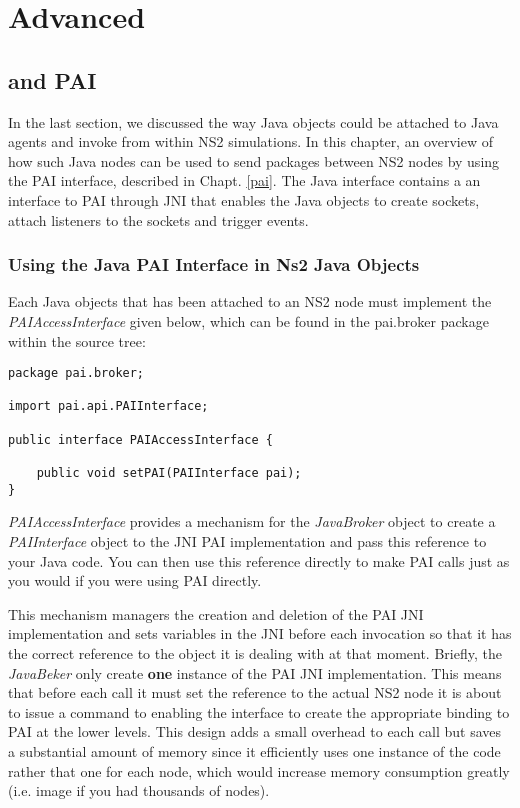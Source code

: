 \chapter{Advanced \agentj}
\label{jnipai}

\section{\agentj and PAI}

In the last section, we discussed the way Java objects could be
attached to Java agents and invoke from within NS2 simulations.
In this chapter, an overview of how such Java nodes can be used 
to send packages between NS2 nodes by using the PAI interface,
described in Chapt. \ref{pai}.  The Java interface contains a
an interface to PAI through JNI that enables the Java objects
to create sockets, attach listeners to the sockets and trigger 
events.

\subsection{Using the Java PAI Interface in Ns2 Java Objects}
\label{jnipai:jpaireqs}
 
Each Java objects that has been attached to an NS2 node
must implement the \emph{PAIAccessInterface} given
below, which can be found in the pai.broker package within the
source tree:

\footnotesize
\begin{verbatim}
package pai.broker;

import pai.api.PAIInterface;

public interface PAIAccessInterface {

    public void setPAI(PAIInterface pai);
}

\end{verbatim}
\normalsize


\emph{PAIAccessInterface} provides a mechanism for the 
\emph{JavaBroker} object to create a \emph{PAIInterface} 
object to the JNI PAI implementation and pass this reference 
to your Java code.  You can then use this reference 
directly to make PAI calls just as you would if you were 
using PAI directly.

This mechanism managers the creation and deletion of the
PAI JNI implementation and sets variables in the JNI before
each invocation so that it has the correct reference to the 
object it is dealing with at that moment.  Briefly, the 
\emph{JavaBeker} only create \textbf{one} instance of
the PAI JNI implementation. This means that before each
call it must set the reference to the actual NS2 node it is
about to issue a command to enabling the interface to 
create the appropriate binding to PAI at the lower levels.
This design adds a small overhead to each call but saves
a substantial amount of memory since it efficiently uses
one instance of the code rather that one for each node,
which would increase memory consumption greatly (i.e.
image if you had thousands of nodes).


